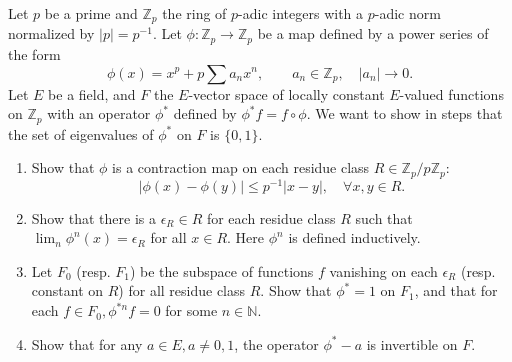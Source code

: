 \begin{exercise}
\label{algebra:2015:4}
Let $p$ be a prime and $\mathbb{Z}_p$ the ring of $p$-adic integers with a $p$-adic norm normalized by $|p| = p^{-1}$. Let $\phi : \mathbb{Z}_p \to \mathbb{Z}_p$ be a map defined by a power series of the form
\[
\phi(x) = x^p + p \sum a_n x^n, \qquad a_n \in \mathbb{Z}_p, \quad |a_n| \to 0.
\]
Let $E$ be a field, and $F$ the $E$-vector space of locally constant $E$-valued functions on $\mathbb{Z}_p$ with an operator $\phi^*$ defined by $\phi^* f = f \circ \phi$. We want to show in steps that the set of eigenvalues of $\phi^*$ on $F$ is $\{0, 1\}$.
\begin{enumerate}
    \item Show that $\phi$ is a contraction map on each residue class $R \in \mathbb{Z}_p / p\mathbb{Z}_p$:
    \[
    |\phi(x) - \phi(y)| \leq p^{-1} |x - y|, \quad \forall x, y \in R.
    \]
    \item Show that there is a $\epsilon_R \in R$ for each residue class $R$ such that $\lim_n \phi^n(x) = \epsilon_R$ for all $x \in R$. Here $\phi^n$ is defined inductively.
    \item Let $F_0$ (resp. $F_1$) be the subspace of functions $f$ vanishing on each $\epsilon_R$ (resp. constant on $R$) for all residue class $R$. Show that $\phi^* = 1$ on $F_1$, and that for each $f \in F_0, \phi^{*n} f = 0$ for some $n \in \mathbb{N}$.
    \item Show that for any $a \in E, a \neq 0, 1$, the operator $\phi^* - a$ is invertible on $F$.
\end{enumerate}
\end{exercise}

